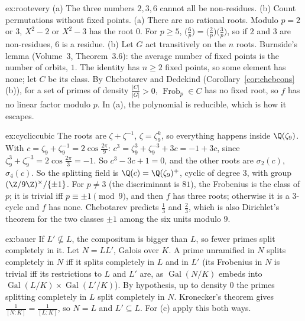 \begin{solution}{ex:rootevery}
\idea (a) The three numbers $2,3,6$ cannot all be non-residues. (b) Count permutations without fixed points.
\writeup (a) There are no rational roots. Modulo $p=2$ or $3$, $X^2-2$ or $X^2-3$ has the root $0$. For $p\ge5$, $\bigl(\frac6p\bigr)=\bigl(\frac2p\bigr)
\bigl(\frac3p\bigr)$, so if $2$ and $3$ are non-residues, $6$ is a residue. (b) Let $G$ act transitively on the $n$ roots. Burnside's lemma (Volume~3, Theorem~3.6):
the average number of fixed points is the number of orbits, $1$. The identity has $n\ge2$ fixed points, so some element has none; let $C$ be its class.
By Chebotarev and Dedekind (Corollary~\ref{cor:chebcons}(b)), for a set of primes of density $\frac{|C|}{|G|}>0$, $\operatorname{Frob}_p\in C$ has no
fixed root, so $f$ has no linear factor modulo $p$. In (a), the polynomial is reducible, which is how it escapes.
\end{solution}

\begin{solution}{ex:cycliccubic}
\idea The roots are $\zeta+\zeta^{-1}$, $\zeta=\zeta_9^k$, so everything happens inside $\Q(\zeta_9)$.
\writeup With $c=\zeta_9+\zeta_9^{-1}=2\cos\frac{2\pi}9$: $c^3=\zeta_9^3+\zeta_9^{-3}+3c=-1+3c$, since $\zeta_9^3+\zeta_9^{-3}=2\cos\frac{2\pi}3=-1$. So
$c^3-3c+1=0$, and the other roots are $\sigma_2(c)$, $\sigma_4(c)$. So the splitting field is $\Q(c)=\Q(\zeta_9)^+$, cyclic of degree $3$, with group
$(\Z/9\Z)^\times/\{\pm1\}$. For $p\ne3$ (the discriminant is $81$), the Frobenius is the class of $p$; it is trivial iff $p\equiv\pm1\pmod9$, and then $f$
has three roots; otherwise it is a $3$-cycle and $f$ has none. Chebotarev predicts $\frac13$ and $\frac23$, which is also Dirichlet's theorem for the
two classes $\pm1$ among the six units modulo $9$.
\end{solution}

\begin{solution}{ex:bauer}
\idea If $L'\not\subseteq L$, the compositum is bigger than $L$, so fewer primes split completely in it.
\writeup Let $N=LL'$, Galois over $K$. A prime unramified in $N$ splits completely in $N$ iff it splits completely in $L$ and in $L'$ (its Frobenius in
$N$ is trivial iff its restrictions to $L$ and $L'$ are, as $\operatorname{Gal}(N/K)$ embeds into $\operatorname{Gal}(L/K)\times
\operatorname{Gal}(L'/K)$). By hypothesis, up to density $0$ the primes splitting completely in $L$ split completely in $N$. Kronecker's theorem gives
$\frac1{[N:K]}=\frac1{[L:K]}$, so $N=L$ and $L'\subseteq L$. For (c) apply this both ways.
\end{solution}

